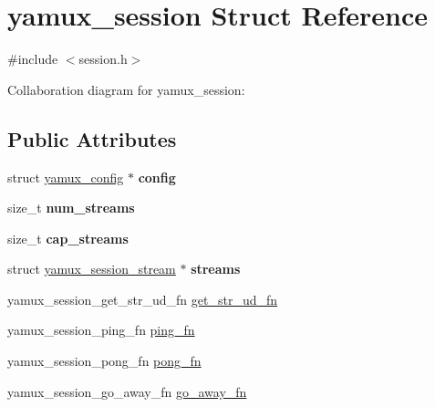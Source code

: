 \hypertarget{structyamux__session}{}\section{yamux\+\_\+session Struct Reference}
\label{structyamux__session}


{\ttfamily \#include $<$session.\+h$>$}



Collaboration diagram for yamux\+\_\+session\+:
\subsection*{Public Attributes}
\begin{DoxyCompactItemize}
\item 
\mbox{\label{structyamux__session_a7e5721d6d182350ed9d07c0270efa85e}} 
struct \mbox{\hyperlink{structyamux__config}{yamux\+\_\+config}} $\ast$ {\bfseries config}
\item 
\mbox{\label{structyamux__session_add2383f7ddab88a9ef2933f7f9e82eeb}} 
size\+\_\+t {\bfseries num\+\_\+streams}
\item 
\mbox{\label{structyamux__session_aa504cc06624603c7f3ee6101c21f9e79}} 
size\+\_\+t {\bfseries cap\+\_\+streams}
\item 
\mbox{\label{structyamux__session_a33891f082563b6b77e6247c06b160081}} 
struct \mbox{\hyperlink{structyamux__session__stream}{yamux\+\_\+session\+\_\+stream}} $\ast$ {\bfseries streams}
\item 
yamux\+\_\+session\+\_\+get\+\_\+str\+\_\+ud\+\_\+fn \mbox{\hyperlink{structyamux__session_a62609306d0e7416f3f0ac8b758c5cfae}{get\+\_\+str\+\_\+ud\+\_\+fn}}
\item 
yamux\+\_\+session\+\_\+ping\+\_\+fn \mbox{\hyperlink{structyamux__session_a3377e4e8b6af2c4dd18acff361a10998}{ping\+\_\+fn}}
\item 
yamux\+\_\+session\+\_\+pong\+\_\+fn \mbox{\hyperlink{structyamux__session_a3e1679746e07a7259aca4efe8ff5b629}{pong\+\_\+fn}}
\item 
yamux\+\_\+session\+\_\+go\+\_\+away\+\_\+fn \mbox{\hyperlink{structyamux__session_a7b9877d769f3dcf49964b7b15c84b832}{go\+\_\+away\+\_\+fn}}
\item 

\end{DoxyCompactItemize}
